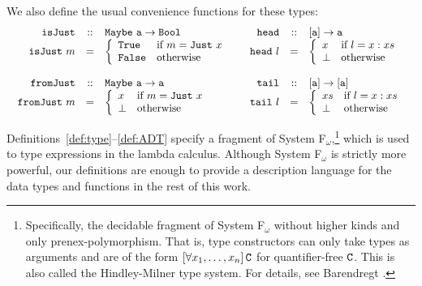 \noindent
We also define the usual convenience functions for these types:
$$
	\begin{array}{l l}
		\begin{array}{r c l}
			\mathtt{isJust} & :: & \mathtt{Maybe\ a \rightarrow Bool}\\
			\mathtt{isJust}\ m & = & \left\{
				\begin{array}{l l}
					\mathtt{True} & \textnormal{if } m = \mathtt{Just}\ x\\
					\mathtt{False} & \textnormal{otherwise}\\
				\end{array}
			\right.\\
			\\
			\mathtt{fromJust} & :: & \mathtt{Maybe\ a \rightarrow a}\\
			\mathtt{fromJust}\ m & = & \left\{
				\begin{array}{l l}
					x & \textnormal{if } m = \mathtt{Just}\ x\\
					\bot & \textnormal{otherwise}\\
				\end{array}
			\right.\\
		\end{array}
		&
		\begin{array}{r c l}
			\mathtt{head} & :: & \mathtt{[a] \rightarrow a}\\
			\mathtt{head}\ l & = & \left\{
				\begin{array}{l l}
					x & \textnormal{if } l = x:xs\\
					\bot & \textnormal{otherwise}\\
				\end{array}
			\right.\\
			\\
			\mathtt{tail} & :: & \mathtt{[a] \rightarrow [a]}\\
			\mathtt{tail}\ l & = & \left\{
				\begin{array}{l l}
					xs & \textnormal{if } l = x:xs\\
					\bot & \textnormal{otherwise}\\
				\end{array}
			\right.\\
		\end{array}
	\end{array}
$$

Definitions~\ref{def:type}--\ref{def:ADT} specify a fragment of System F$_\omega$,\footnote{Specifically, the decidable fragment of System F$_\omega$ without higher kinds and only prenex-polymorphism. That is, type constructors can only take types as arguments and are of the form $\left[\forall x_1,\dots,x_n \right] \mathtt{C}$ for quantifier-free $\mathtt{C}$. This is also called the Hindley-Milner type system. For details, see Barendregt \cite{barendregt91}.} which is used to type expressions in the lambda calculus. Although System F$_\omega$ is strictly more powerful, our definitions are enough to provide a description language for the data types and functions in the rest of this work.


